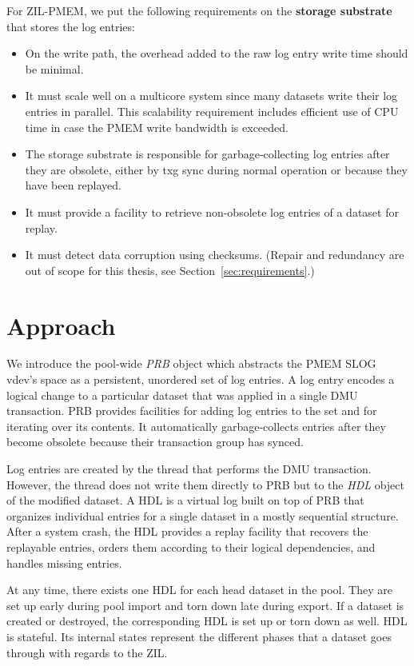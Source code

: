 \documentclass[12pt,a4paper,twoside]{book}
\begin{document}
For ZIL-PMEM, we put the following requirements on the \textbf{storage substrate} that stores the log entries:
\begin{itemize}[noitemsep,beginpenalty=100000,midpenalty=100000]
    \item On the write path, the overhead added to the raw log entry write time should be minimal.
    \item It must scale well on a multicore system since many datasets write their log entries in parallel.
        This scalability requirement includes efficient use of CPU time in case the PMEM write bandwidth is exceeded.
    \item The storage substrate is responsible for garbage-collecting log entries after they are obsolete, either by txg sync during normal operation or because they have been replayed.
    \item It must provide a facility to retrieve non-obsolete log entries of a dataset for replay.
    \item It must detect data corruption using checksums. (Repair and redundancy are out of scope for this thesis, see Section~\ref{sec:requirements}.)
\end{itemize}

\section{Approach}\label{di:prb:approach}
We introduce the pool-wide \textit{PRB} object which abstracts the PMEM SLOG vdev's space as a persistent, unordered set of log entries.
A log entry encodes a logical change to a particular dataset that was applied in a single DMU transaction.
PRB provides facilities for adding log entries to the set and for iterating over its contents.
It automatically garbage-collects entries after they become obsolete because their transaction group has synced.

Log entries are created by the thread that performs the DMU transaction.
However, the thread does not write them directly to PRB but to the \textit{HDL} object of the modified dataset.
A HDL is a virtual log built on top of PRB that organizes individual entries for a single dataset in a mostly sequential structure.
After a system crash, the HDL provides a replay facility that recovers the replayable entries, orders them according to their logical dependencies, and handles missing entries.

At any time, there exists one HDL for each head dataset in the pool.
They are set up early during pool import and torn down late during export.
If a dataset is created or destroyed, the corresponding HDL is set up or torn down as well.
HDL is stateful.
Its internal states represent the different phases that a dataset goes through with regards to the ZIL.
\end{document}
